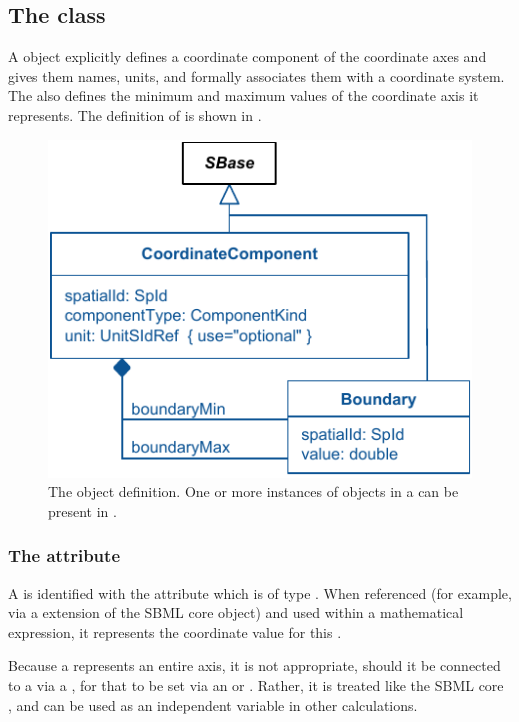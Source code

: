 \subsection{The  class}
\label{CoordinateComponent-class}
A \CoordinateComponent object explicitly defines a coordinate component of the coordinate axes and gives them names, units, and formally associates them with a coordinate system. The \CoordinateComponent also defines the minimum and maximum values of the coordinate axis it represents. The definition of \CoordinateComponent is shown in .
 
\begin{figure}[ht]
  \includegraphics{figs/CoordinateComponent-uml}
  \caption{The \CoordinateComponent object definition. One or more instances of \CoordinateComponent objects in a \ListOfCoordinateComponents can be present in \Geometry.}
  \label{CoordinateComponent-uml}
\end{figure}


\subsubsection{The  attribute}
A \CoordinateComponent is identified with the  attribute which is of type .  When referenced (for example, via a \SpatialSymbolReference extension of the SBML core \Parameter object) and used within a mathematical expression, it represents the coordinate value for this \CoordinateComponent.
 
Because a \CoordinateComponent represents an entire axis, it is not appropriate, should it be connected to a \Parameter via a \SpatialSymbolReference, for that \Parameter to be set via an \InitialAssignment or \Rule.  Rather, it is treated like the SBML core  , and can be used as an independent variable in other calculations.

